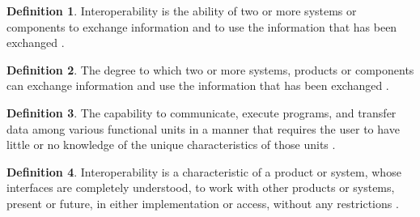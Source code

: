 \documentclass[letterpaper,cleveref]{lipics-v2019}
\theoremstyle{definition}
\newtheorem{defn}{Definition}
\begin{document}
\begin{defn}
Interoperability is the ability of two or more systems or components to exchange
information and to use the information that has been exchanged
\citep{IEEEComputerDictionary1991}.
\end{defn}
\begin{defn}
The degree to which two or more systems, products or components can exchange
information and use the information that has been exchanged
\citep{ISO/IEC25010}.
\end{defn}
\begin{defn}
The capability to communicate, execute programs, and transfer data among various
functional units in a manner that requires the user to have little or no
knowledge of the unique characteristics of those units
\citep{ISO/IEC/IEEE24765}.
\end{defn}
\begin{defn}Interoperability is a characteristic of a product or system, whose
interfaces are completely understood, to work with other products or systems,
present or future, in either implementation or access, without any restrictions
\citep{AFUL2019}.
\end{defn}
\end{document}
